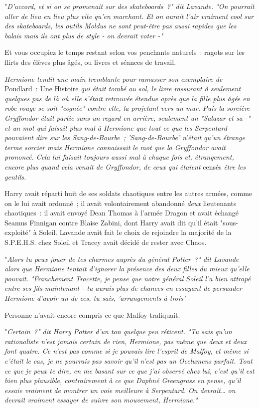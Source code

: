 "\emph{D'accord, et si on se promenait sur des skateboards~?" dit Lavande. "On pourrait aller de lieu en lieu plus vite qu'en marchant. Et on aurait l'air vraiment cool sur des skateboards, les outils Moldus ne sont peut-être pas aussi rapides que les balais mais ils ont plus de style - on devrait voter -"}

Et vous occupiez le temps restant selon vos penchants naturels~: ragots sur les flirts des élèves plus âgés, ou livres et séances de travail.

\emph{Hermione tendit une main tremblante pour ramasser son exemplaire de} Poudlard~: Une Histoire \emph{qui était tombé au sol, le livre rassurant à seulement quelques pas de là où elle s'était retrouvée étendue après que la fille plus âgée en robe rouge se soit "cognée" contre elle, la projetant vers un mur. Puis la sorcière Gryffondor était partie sans un regard en arrière, seulement un "Salazar et sa -" et un mot qui faisait plus mal à Hermione que tout ce que les Serpentard pouvaient dire sur les Sang-de-Bourbe~; 'Sang-de-Bourbe' n'était qu'un étrange terme sorcier mais Hermione connaissait le mot que la Gryffondor avait prononcé. Cela lui faisait toujours aussi mal à chaque fois et, étrangement, encore plus quand cela venait de Gryffondor, de ceux qui étaient} censés \emph{être les gentils.}

Harry avait réparti huit de ses soldats chaotiques entre les autres armées, comme on le lui avait ordonné~; il avait volontairement abandonné \emph{deux} lieutenants chaotiques~: il avait envoyé Dean Thomas à l'armée Dragon et avait échangé Seamus Finnigan contre Blaise Zabini, dont Harry avait dit qu'il était "sous-exploité" à Soleil. Lavande avait fait le choix de rejoindre la majorité de la S.P.E.H.S. chez Soleil et Tracey avait décidé de rester avec Chaos.

"\emph{Alors tu peux jouer de tes charmes auprès du général Potter~?" dit Lavande alors que Hermione tentait d'ignorer la présence des deux filles du mieux qu'elle pouvait. "Franchement Tracette, je pense que notre général Soleil l'a bien attrapé entre ses fils maintenant - tu aurais plus de chances en essayant de persuader Hermione d'avoir un de ces, tu sais, 'arrangements à trois' -}

Personne n'avait encore compris ce que Malfoy trafiquait.

"\emph{Certain~?" dit Harry Potter d'un ton quelque peu réticent. "Tu sais qu'un rationaliste n'est jamais certain de rien, Hermione, pas même que deux et deux font quatre. Ce n'est pas comme si je pouvais lire l'esprit de Malfoy, et même si c'était le cas, je ne pourrais pas savoir qu'il n'est pas un Occlumens parfait. Tout ce que je peux te dire, en me basant sur ce que j'ai observé chez lui, c'est qu'il est bien plus plausible, contrairement à ce que Daphné Greengrass en pense, qu'il essaie vraiment de montrer un voie meilleure à Serpentard. On devrait… on devrait vraiment essayer de suivre son mouvement, Hermione."}

